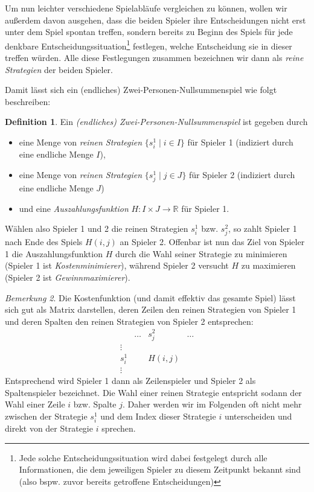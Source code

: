 \documentclass[a4paper,ngerman,12pt,bibtotoc]{scrartcl}
\theoremstyle{definition}
\newtheorem{defn}{Definition}[section]
\theoremstyle{plain}
\theoremstyle{remark}
\newtheorem{bem}[defn]{Bemerkung}
\renewcommand{\_}{\mathpunct{.}\,}
\newcommand{\?}{\,{:}\,}
\newcommand{\Hf}{H}
\newcommand{\ZPNS}{Zwei-Personen-Nullsummenspiel }
\begin{document}
	Um nun leichter verschiedene Spielabläufe vergleichen zu können, wollen wir außerdem davon ausgehen, dass die beiden Spieler ihre Entscheidungen nicht erst unter dem Spiel \glqq spontan\grqq{} treffen, sondern bereits zu Beginn des Spiels für jede denkbare Entscheidungssituation\footnote{Jede solche Entscheidungssituation wird dabei festgelegt durch alle Informationen, die dem jeweiligen Spieler zu diesem Zeitpunkt bekannt sind (also bspw. zuvor bereits getroffene Entscheidungen)} festlegen, welche Entscheidung sie in dieser treffen würden. Alle diese Festlegungen zusammen bezeichnen wir dann als \emph{reine Strategien} der beiden Spieler.
	
	Damit lässt sich ein (endliches) \ZPNS wie folgt beschreiben:
	
	\begin{defn}
		Ein \emph{(endliches) \ZPNS} ist gegeben durch
		\begin{itemize}
			\item eine Menge von \emph{reinen Strategien} $\{s^1_i \mid i \in I\}$ für Spieler 1 (indiziert durch eine endliche Menge $I$),
			\item eine Menge von \emph{reinen Strategien} $\{s^1_j \mid j \in J\}$ für Spieler 2 (indiziert durch eine endliche Menge $J$)
			\item und eine \emph{Auszahlungsfunktion} $\Hf: I \times J \to \mathbb{R}$ für Spieler 1.
		\end{itemize}
		Wählen also Spieler 1 und 2 die reinen Strategien $s^1_i$ bzw. $s^2_j$, so zahlt Spieler 1 nach Ende des Spiels $\Hf(i,j)$ an Spieler 2. Offenbar ist nun das Ziel von Spieler 1 die Auszahlungsfunktion $\Hf$ durch die Wahl seiner Strategie zu minimieren (Spieler 1 ist \emph{Kostenminimierer}), während Spieler 2 versucht $\Hf$ zu maximieren (Spieler 2 ist \emph{Gewinnmaximierer}).
	\end{defn}
	
	\begin{bem}
		Die Kostenfunktion (und damit effektiv das gesamte Spiel) lässt sich gut als Matrix darstellen, deren Zeilen den reinen Strategien von Spieler 1 und deren Spalten den reinen Strategien von Spieler 2 entsprechen:
		\[\begin{array}{l||c|c|c}
					& \dots & s^2_j	& \dots \\\hline\hline
			 \vdots & 		&		&		\\\hline
			 s^1_i	&		&\Hf(i,j)&		\\\hline
			 \vdots &		&		&			
		\end{array}\]
		Entsprechend wird Spieler 1 dann als \glqq Zeilenspieler\grqq{} und Spieler 2 als \glqq Spaltenspieler\grqq{} bezeichnet. Die Wahl einer reinen Strategie entspricht sodann der Wahl einer Zeile $i$ bzw. Spalte $j$. Daher werden wir im Folgenden oft nicht mehr zwischen der Strategie $s^1_i$ und dem Index dieser Strategie $i$ unterscheiden und direkt von der \glqq Strategie $i$\grqq{} sprechen.
	\end{bem}	
\end{document}
